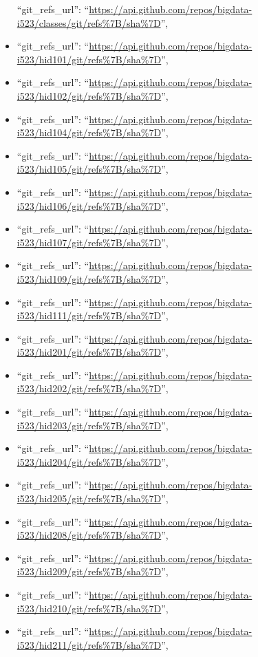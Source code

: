 \begin{itemize}
  ``git\_refs\_url'':
  ``\url{https://api.github.com/repos/bigdata-i523/classes/git/refs\%7B/sha\%7D}'',
\item
  ``git\_refs\_url'':
  ``\url{https://api.github.com/repos/bigdata-i523/hid101/git/refs\%7B/sha\%7D}'',
\item
  ``git\_refs\_url'':
  ``\url{https://api.github.com/repos/bigdata-i523/hid102/git/refs\%7B/sha\%7D}'',
\item
  ``git\_refs\_url'':
  ``\url{https://api.github.com/repos/bigdata-i523/hid104/git/refs\%7B/sha\%7D}'',
\item
  ``git\_refs\_url'':
  ``\url{https://api.github.com/repos/bigdata-i523/hid105/git/refs\%7B/sha\%7D}'',
\item
  ``git\_refs\_url'':
  ``\url{https://api.github.com/repos/bigdata-i523/hid106/git/refs\%7B/sha\%7D}'',
\item
  ``git\_refs\_url'':
  ``\url{https://api.github.com/repos/bigdata-i523/hid107/git/refs\%7B/sha\%7D}'',
\item
  ``git\_refs\_url'':
  ``\url{https://api.github.com/repos/bigdata-i523/hid109/git/refs\%7B/sha\%7D}'',
\item
  ``git\_refs\_url'':
  ``\url{https://api.github.com/repos/bigdata-i523/hid111/git/refs\%7B/sha\%7D}'',
\item
  ``git\_refs\_url'':
  ``\url{https://api.github.com/repos/bigdata-i523/hid201/git/refs\%7B/sha\%7D}'',
\item
  ``git\_refs\_url'':
  ``\url{https://api.github.com/repos/bigdata-i523/hid202/git/refs\%7B/sha\%7D}'',
\item
  ``git\_refs\_url'':
  ``\url{https://api.github.com/repos/bigdata-i523/hid203/git/refs\%7B/sha\%7D}'',
\item
  ``git\_refs\_url'':
  ``\url{https://api.github.com/repos/bigdata-i523/hid204/git/refs\%7B/sha\%7D}'',
\item
  ``git\_refs\_url'':
  ``\url{https://api.github.com/repos/bigdata-i523/hid205/git/refs\%7B/sha\%7D}'',
\item
  ``git\_refs\_url'':
  ``\url{https://api.github.com/repos/bigdata-i523/hid208/git/refs\%7B/sha\%7D}'',
\item
  ``git\_refs\_url'':
  ``\url{https://api.github.com/repos/bigdata-i523/hid209/git/refs\%7B/sha\%7D}'',
\item
  ``git\_refs\_url'':
  ``\url{https://api.github.com/repos/bigdata-i523/hid210/git/refs\%7B/sha\%7D}'',
\item
  ``git\_refs\_url'':
  ``\url{https://api.github.com/repos/bigdata-i523/hid211/git/refs\%7B/sha\%7D}'',

\end{itemize}
